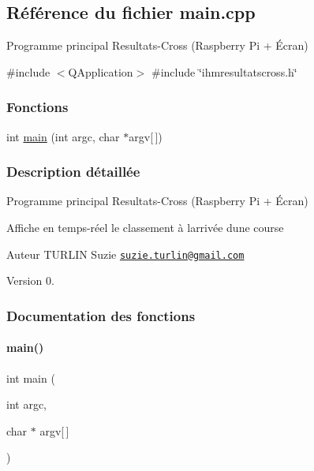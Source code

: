 \hypertarget{_resultats-_cross_2main_8cpp}{}\subsection{Référence du fichier main.\+cpp}
\label{_resultats-_cross_2main_8cpp}


Programme principal Resultats-\/\+Cross (Raspberry Pi + Écran)  


{\ttfamily \#include $<$Q\+Application$>$}\newline
{\ttfamily \#include \char`\"{}ihmresultatscross.\+h\char`\"{}}\newline
\subsubsection*{Fonctions}
\begin{DoxyCompactItemize}
\item 
int \hyperlink{_resultats-_cross_2main_8cpp_a0ddf1224851353fc92bfbff6f499fa97}{main} (int argc, char $\ast$argv\mbox{[}$\,$\mbox{]})
\end{DoxyCompactItemize}


\subsubsection{Description détaillée}
Programme principal Resultats-\/\+Cross (Raspberry Pi + Écran) 

Affiche en temps-\/réel le classement à l\textquotesingle{}arrivée d\textquotesingle{}une course

\begin{DoxyAuthor}{Auteur}
T\+U\+R\+L\+IN Suzie \href{mailto:suzie.turlin@gmail.com}{\tt suzie.\+turlin@gmail.\+com}
\end{DoxyAuthor}
\begin{DoxyVersion}{Version}
0. 
\end{DoxyVersion}


\subsubsection{Documentation des fonctions}
\mbox{\label{_resultats-_cross_2main_8cpp_a0ddf1224851353fc92bfbff6f499fa97}} 
\paragraph{\texorpdfstring{main()}{main()}}
{\footnotesize\ttfamily int main (\begin{DoxyParamCaption}\item[{int}]{argc,  }\item[{char $\ast$}]{argv\mbox{[}$\,$\mbox{]} }\end{DoxyParamCaption})}


